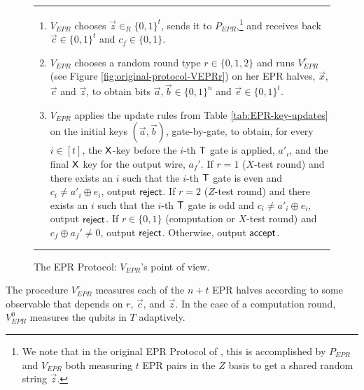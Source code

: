 \documentclass[11pt,letter]{article}
\theoremstyle{remark}
\theoremstyle{definition}
\begin{document}
\begin{figure}[H]
\rule[1ex]{16.5cm}{0.5pt}
\begin{enumerate}
\item $V_{EPR}$ chooses $\vec{z}\in_R\{0,1\}^t$, sends it to $P_{EPR}$,\footnote{We note that in the original EPR Protocol of \cite{broadbent15howtoverify}, this is accomplished by $P_{EPR}$ and $V_{EPR}$ both measuring $t$ EPR pairs in the $Z$ basis to get a shared random string $\vec{z}$.} and receives back $\vec{c}\in\{0,1\}^t$ and $c_f\in\{0,1\}$.
\item $V_{EPR}$ chooses a random round type $r\in\{0,1,2\}$ and runs $V_{EPR}^r$ (see Figure \ref{fig:original-protocol-VEPRr}) on her EPR halves, $\vec{x}$, $\vec{c}$ and $\vec{z}$, to obtain bits $\vec{a},\vec{b}\in\{0,1\}^n$ and $\vec{e}\in\{0,1\}^t$. 
\item $V_{EPR}$ applies the update rules from Table \ref{tab:EPR-key-updates} on the initial keys $(\vec{a},\vec{b})$, gate-by-gate, to obtain, for every $i\in [t]$, the $\sf X$-key before the $i$-th $\sf T$ gate is applied, $a'_i$, and the final $\sf X$ key for the output wire, $a_f'$. If $r=1$ ($X$-test round) and there exists an $i$ such that the $i$-th $\sf T$ gate is even and $c_i\neq a'_i\oplus e_i$, output $\sf reject$. If $r=2$ ($Z$-test round) and there exists an $i$ such that the $i$-th $\sf T$ gate is odd and $c_i\neq a'_i\oplus e_i$, output $\sf reject$. If $r\in\{0,1\}$ (computation or $X$-test round) and $c_f\oplus a_f'\neq 0$, output $\sf reject$. Otherwise, output $\sf accept$. 
\end{enumerate}
\rule[2ex]{16.5cm}{0.5pt}\vspace{-.5cm}
\caption{The EPR Protocol: $V_{EPR}$'s point of view.}
  \label{fig:original-protocol-VEPR}
\end{figure}

The procedure $V_{EPR}^r$ measures each of the $n+t$ EPR halves according to some observable that depends on $r$, $\vec{c}$, and $\vec{z}$. In the case of a computation round, $V_{EPR}^0$ measures the qubits in $T$ adaptively. 
\end{document}
